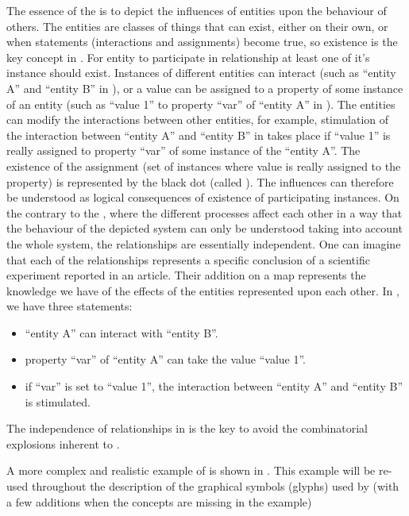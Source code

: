 The essence of the \ERs is to depict the influences of entities upon the behaviour of others. The entities are classes of things that can exist, either on their own, or when statements (interactions and assignments) become true, so existence is the key concept in \ERs. For entity to participate in relationship at least one of it's instance should exist. Instances of different entities can interact (such as ``entity A'' and ``entity B'' in ), or a value can be assigned to a property of some instance of an entity (such as ``value 1'' to property ``var'' of ``entity A'' in ). The entities can modify the interactions between other entities, for example, stimulation of the interaction between ``entity A'' and ``entity B'' in  takes place if ``value 1'' is really assigned to property ``var'' of some instance of the ``entity A''. The existence of the assignment (set of instances where value is really assigned to the property) is represented by the black dot (called ). The influences can therefore be understood as logical consequences of existence of participating instances.  On the contrary to the \PDl, where the different processes affect each other in a way that the behaviour of the depicted system can only be understood taking into account the whole system, the relationships are essentially independent. One can imagine that each of the relationships represents a specific conclusion of a scientific experiment reported in an article. Their addition on a map represents the knowledge we have of the effects of the entities represented upon each other. In  , we have three statements: 

\begin{itemize}
 \item ``entity A'' can interact with ``entity B''.
 \item property ``var'' of ``entity A'' can take the value ``value 1''.
 \item if ``var'' is set to ``value 1'', the interaction between ``entity A'' and ``entity B'' is stimulated.
\end{itemize}


The independence of relationships in \ERs is the key to avoid the combinatorial explosions inherent to \PDs.

A more complex and realistic example of \ERm is shown in . This example will be re-used throughout the description of the graphical symbols (glyphs) used by \SBGNERLone (with a few additions when the concepts are missing in the example) 

